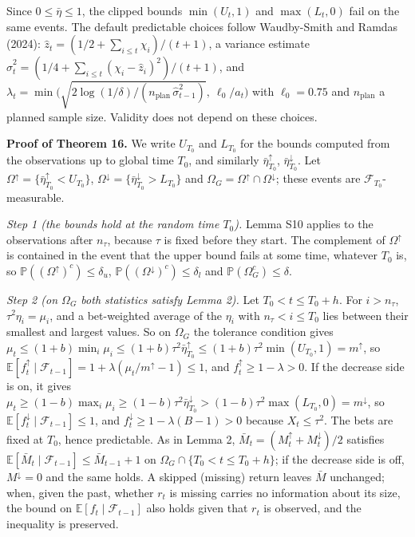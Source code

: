 \documentclass[
]{article}
\begin{document}
Since \(0 \le \bar\eta \le 1\), the clipped bounds \(\min(U_t, 1)\) and
\(\max(L_t, 0)\) fail on the same events. The default predictable
choices follow Waudby-Smith and Ramdas (2024):
\(\hat z_t = (1/2 + \sum_{i \le t} \chi_i)/(t + 1)\), a variance
estimate
\(\hat\sigma_t^2 = (1/4 + \sum_{i \le t}(\chi_i - \hat z_i)^2)/(t + 1)\),
and
\(\lambda_t = \min\big(\sqrt{2\log(1/\delta)/(n_{\mathrm{plan}}\,\hat\sigma_{t-1}^2)},\ \ell_0/a_t\big)\)
with \(\ell_0 = 0.75\) and \(n_{\mathrm{plan}}\) a planned sample size.
Validity does not depend on these choices.

\textbf{Proof of Theorem 16.} We write \(U_{T_0}\) and \(L_{T_0}\) for
the bounds computed from the observations up to global time \(T_0\), and
similarly \(\bar\eta_{T_0}^{\uparrow}\),
\(\bar\eta_{T_0}^{\downarrow}\). Let
\(\Omega^{\uparrow} = \lbrace \bar\eta_{T_0}^{\uparrow} < U_{T_0}\rbrace\),
\(\Omega^{\downarrow} = \lbrace \bar\eta_{T_0}^{\downarrow} > L_{T_0}\rbrace\)
and \(\Omega_G = \Omega^{\uparrow} \cap \Omega^{\downarrow}\); these
events are \(\mathcal{F}_{T_0}\)-measurable.

\emph{Step 1 (the bounds hold at the random time \(T_0\)).} Lemma S10
applies to the observations after \(n_\tau\), because \(\tau\) is fixed
before they start. The complement of \(\Omega^{\uparrow}\) is contained
in the event that the upper bound fails at some time, whatever \(T_0\)
is, so \(\mathbb{P}((\Omega^{\uparrow})^c) \le \delta_u\),
\(\mathbb{P}((\Omega^{\downarrow})^c) \le \delta_l\) and
\(\mathbb{P}(\Omega_G^c) \le \delta\).

\emph{Step 2 (on \(\Omega_G\) both statistics satisfy Lemma 2).} Let
\(T_0 < t \le T_0 + h\). For \(i > n_\tau\), \(\tau^2\eta_i = \mu_i\),
and a bet-weighted average of the \(\eta_i\) with \(n_\tau < i \le T_0\)
lies between their smallest and largest values. So on \(\Omega_G\) the
tolerance condition gives
\(\mu_t \le (1+b)\min_i\mu_i \le (1+b)\tau^2\bar\eta_{T_0}^{\uparrow} \le (1+b)\tau^2\min(U_{T_0}, 1) = m^{\uparrow}\),
so
\(\mathbb{E}[f_t^{\uparrow} \mid \mathcal{F}_{t-1}] = 1 + \lambda(\mu_t/m^{\uparrow} - 1) \le 1\),
and \(f_t^{\uparrow} \ge 1 - \lambda > 0\). If the decrease side is on,
it gives
\(\mu_t \ge (1-b)\max_i\mu_i \ge (1-b)\tau^2\bar\eta_{T_0}^{\downarrow} > (1-b)\tau^2\max(L_{T_0}, 0) = m^{\downarrow}\),
so \(\mathbb{E}[f_t^{\downarrow} \mid \mathcal{F}_{t-1}] \le 1\), and
\(f_t^{\downarrow} \ge 1 - \lambda(B-1) > 0\) because
\(X_t \le \tau^2\). The bets are fixed at \(T_0\), hence predictable. As
in Lemma 2, \(\bar M_t = (M_t^{\uparrow} + M_t^{\downarrow})/2\)
satisfies
\(\mathbb{E}[\bar M_t \mid \mathcal{F}_{t-1}] \le \bar M_{t-1} + 1\) on
\(\Omega_G \cap \lbrace T_0 < t \le T_0 + h\rbrace\); if the decrease
side is off, \(M^{\downarrow} = 0\) and the same holds. A skipped
(missing) return leaves \(\bar M\) unchanged; when, given the past,
whether \(r_t\) is missing carries no information about its size, the
bound on \(\mathbb{E}[f_t \mid \mathcal{F}_{t-1}]\) also holds given
that \(r_t\) is observed, and the inequality is preserved.
\end{document}
